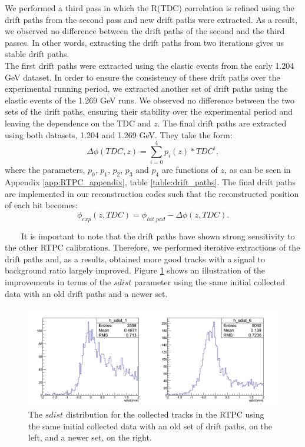 We performed a third pass in which the R(TDC) correlation is refined using the drift paths from the second pass and new drift paths were extracted. As a result, we observed no difference between the drift paths of the second and the third passes. In other words, extracting the drift paths from two iterations gives us stable drift paths. \\

The first drift paths were extracted using the elastic events from the early 1.204 GeV dataset. In order to ensure the consistency of these drift paths over the experimental running period, we extracted another set of drift paths using the elastic events of the 1.269 GeV runs. We observed no difference between the two sets of the drift paths, ensuring their stability over the experimental period and leaving the dependence on the TDC and $z$. The final drift paths are extracted using both datasets, 1.204 and 1.269 GeV. They take the form:
\vspace{-0.1in}
\begin{equation}
\Delta \phi (TDC, z)=  \sum\limits_{i=0}^{4} p_{i}(z)*TDC^{i},
\end{equation}
where the parameters, $p_{0}$, $p_{1}$, $p_{2}$, $p_{3}$ and $p_{4}$ are functions of $z$, as can be seen in Appendix \ref{app:RTPC_appendix}, table \ref{table:drift_paths}. The final drift paths are implemented in our reconstruction codes such that the reconstructed position of each hit becomes:
\begin{equation}
\phi_{exp}(z, TDC) = \phi _{hit\_pad} - \Delta \phi (z, TDC).
\end{equation} 

~~~~It is important to note that the drift paths have shown strong sensitivity to the other RTPC calibrations. Therefore, we performed iterative extractions of the drift paths and, as a results, obtained more good tracks with a signal to background ratio largely improved. Figure \ref{fig:sdist_comp_pass1v1_v6} shows an illustration of the improvements in terms of the $sdist$ parameter using the same initial collected data with an old drift paths and a newer set.

\begin{figure}[tp]
\centering
\includegraphics[scale=0.38]{fig_rtpc/sdist_comp_pass1_v1_v6.png}
\caption{The $sdist$ distribution for the collected tracks in the RTPC using the same initial collected data with an old set of drift paths, on the left, and a newer set, on the right.}
\label{fig:sdist_comp_pass1v1_v6}
\end{figure}

